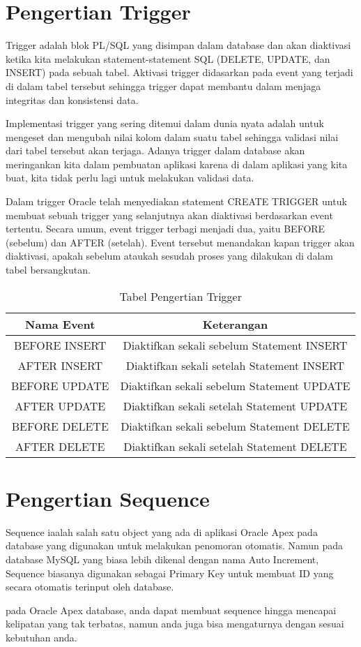 \section{Pengertian Trigger}
Trigger adalah blok PL/SQL yang disimpan dalam database dan akan diaktivasi ketika kita melakukan statement-statement SQL (DELETE, UPDATE, dan INSERT) pada sebuah tabel. Aktivasi trigger didasarkan pada event yang terjadi di dalam tabel tersebut sehingga trigger dapat membantu dalam menjaga integritas dan konsistensi data.
\par Implementasi trigger yang sering ditemui dalam dunia nyata adalah untuk mengeset dan mengubah nilai kolom dalam suatu tabel sehingga validasi nilai dari tabel tersebut akan terjaga. Adanya trigger dalam database akan meringankan kita dalam pembuatan aplikasi karena di dalam aplikasi yang kita buat, kita tidak perlu lagi untuk melakukan validasi data.
\par Dalam trigger Oracle telah menyediakan statement CREATE TRIGGER untuk membuat
sebuah trigger yang selanjutnya akan diaktivasi berdasarkan event tertentu. Secara
umum, event trigger terbagi menjadi dua, yaitu BEFORE (sebelum) dan AFTER
(setelah). Event tersebut menandakan kapan trigger akan diaktivasi, apakah sebelum
ataukah sesudah proses yang dilakukan di dalam tabel bersangkutan\cite{mudafiq2003trigger}.
\begin{table}[]
    \begin{center}
\begin{tabular}{ |c|c| } 
 \hline
 Nama Event & Keterangan  \\ \hline 
 BEFORE INSERT & Diaktifkan sekali sebelum Statement INSERT  \\ \hline
 AFTER INSERT & Diaktifkan sekali setelah Statement INSERT  \\ \hline
 BEFORE UPDATE & Diaktifkan sekali sebelum Statement UPDATE \\ \hline
 AFTER UPDATE & Diaktifkan sekali setelah Statement UPDATE \\ \hline
 BEFORE DELETE & Diaktifkan sekali sebelum Statement DELETE \\ \hline
 AFTER DELETE & Diaktifkan sekali setelah Statement DELETE \\
 \hline
\end{tabular}
\caption{Tabel Pengertian Trigger}
    \label{tabel_kebutuhan_sistem}
\end{center}
\end{table}
\section{Pengertian Sequence}
Sequence iaalah salah satu object yang ada di aplikasi Oracle Apex pada database yang digunakan untuk melakukan penomoran otomatis. Namun pada database MySQL yang biasa lebih dikenal dengan nama Auto Increment, Sequence biasanya digunakan sebagai Primary Key untuk membuat ID yang secara otomatis terinput oleh database.
\par pada Oracle Apex database, anda dapat membuat sequence hingga mencapai kelipatan yang tak terbatas, namun anda juga bisa mengaturnya dengan sesuai kebutuhan anda.

